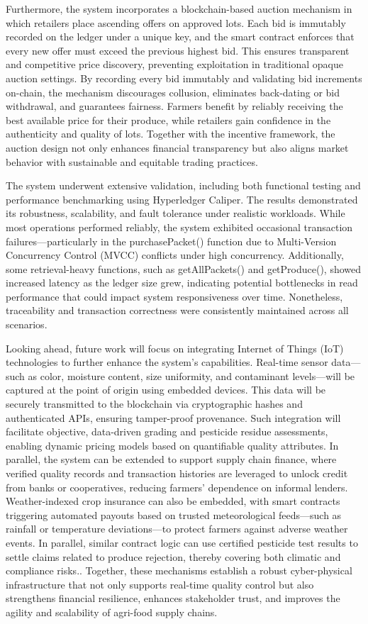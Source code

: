 \documentclass[12pt]{article}
\begin{document}
	Furthermore, the system incorporates a blockchain-based auction mechanism in which retailers place ascending offers on approved lots. Each bid is immutably recorded on the ledger under a unique key, and the smart contract enforces that every new offer must exceed the previous highest bid. This ensures transparent and competitive price discovery, preventing exploitation in traditional opaque auction settings. By recording every bid immutably and validating bid increments on-chain, the mechanism discourages collusion, eliminates back-dating or bid withdrawal, and guarantees fairness. Farmers benefit by reliably receiving the best available price for their produce, while retailers gain confidence in the authenticity and quality of lots. Together with the incentive framework, the auction design not only enhances financial transparency but also aligns market behavior with sustainable and equitable trading practices. 
	
	The system underwent extensive validation, including both functional testing and performance benchmarking using Hyperledger Caliper. The results demonstrated its robustness, scalability, and fault tolerance under realistic workloads. While most operations performed reliably, the system exhibited occasional transaction failures—particularly in the purchasePacket() function due to Multi-Version Concurrency Control (MVCC) conflicts under high concurrency. Additionally, some retrieval-heavy functions, such as getAllPackets() and getProduce(), showed increased latency as the ledger size grew, indicating potential bottlenecks in read performance that could impact system responsiveness over time. Nonetheless, traceability and transaction correctness were consistently maintained across all scenarios.
	
	Looking ahead, future work will focus on integrating Internet of Things (IoT) technologies to further enhance the system’s capabilities. Real-time sensor data—such as color, moisture content, size uniformity, and contaminant levels—will be captured at the point of origin using embedded devices. This data will be securely transmitted to the blockchain via cryptographic hashes and authenticated APIs, ensuring tamper-proof provenance. Such integration will facilitate objective, data-driven grading and pesticide residue assessments, enabling dynamic pricing models based on quantifiable quality attributes. In parallel, the system can be extended to support supply chain finance, where verified quality records and transaction histories are leveraged to unlock credit from banks or cooperatives, reducing farmers’ dependence on informal lenders. Weather-indexed crop insurance can also be embedded, with smart contracts triggering automated payouts based on trusted meteorological feeds—such as rainfall or temperature deviations—to protect farmers against adverse weather events. In parallel, similar contract logic can use certified pesticide test results to settle claims related to produce rejection, thereby covering both climatic and compliance risks.. Together, these mechanisms establish a robust cyber-physical infrastructure that not only supports real-time quality control but also strengthens financial resilience, enhances stakeholder trust, and improves the agility and scalability of agri-food supply chains.
	
\end{document}
